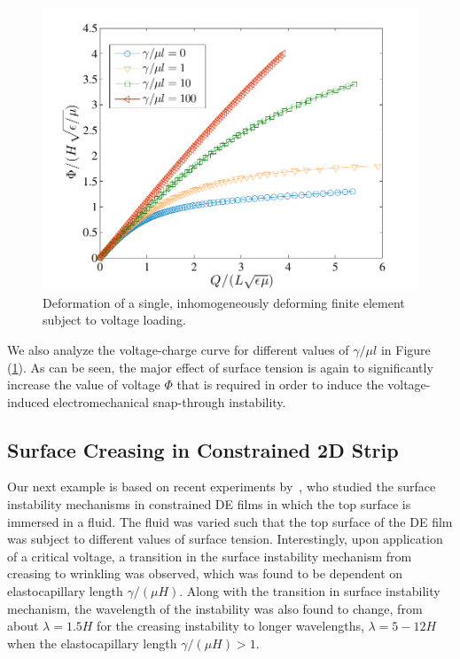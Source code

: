 \documentclass[8.5pt,twoside,twocolumn]{article}
\begin{document}
\begin{figure} \centering 
\includegraphics[scale=0.6]{pics/voltage_inhom.pdf}
\caption{Deformation of a single, inhomogeneously deforming finite element subject to voltage loading.}    
\label{inhomo}  \end{figure}

We also analyze the voltage-charge curve for different values of $\gamma/\mu l$ in Figure (\ref{inhomo}).  As can be seen, the major effect of surface tension is again to significantly increase the value of voltage $\Phi$ that is required in order to induce the voltage-induced electromechanical snap-through instability.

\subsection{Surface Creasing in Constrained 2D Strip}

Our next example is based on recent experiments by~\citet{wangPRE2013}, who studied the surface instability mechanisms in constrained DE films in which the top surface is immersed in a fluid.  The fluid was varied such that the top surface of the DE film was subject to different values of surface tension.  Interestingly, upon application of a critical voltage, a transition in the surface instability mechanism from creasing to wrinkling was observed, which was found to be dependent on elastocapillary length $\gamma/(\mu H)$.  Along with the transition in surface instability mechanism, the wavelength of the instability was also found to change, from about $\lambda=1.5H$ for the creasing instability to longer wavelengths, $\lambda=5-12H$ when the elastocapillary length $\gamma/(\mu H)>1$.  
\end{document}
